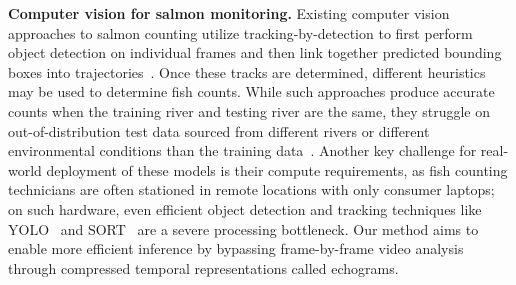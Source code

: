 \noindent
\textbf{Computer vision for salmon monitoring.}
Existing computer vision approaches to salmon counting utilize tracking-by-detection to first perform object detection on individual frames and then link together predicted bounding boxes into trajectories~\cite{kay2022caltechfishcountingdataset,ouis2023yolo}.
Once these tracks are determined, different heuristics may be used to determine fish counts. While such approaches produce accurate counts when the training river and testing river are the same, they struggle on out-of-distribution test data sourced from \eg different rivers or different environmental conditions than the training data~\cite{kay2022caltechfishcountingdataset,kay2024align,kay2023unsupervised}. Another key challenge for real-world deployment of these models is their compute requirements, as fish counting technicians are often stationed in remote locations with only consumer laptops; on such hardware, even efficient object detection and tracking techniques like YOLO~\cite{redmon2016you} and SORT~\cite{bewley2016simple} are a severe processing bottleneck. Our method aims to enable more efficient inference by bypassing frame-by-frame video analysis through compressed temporal representations called echograms.


